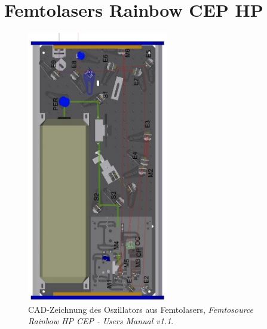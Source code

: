 \documentclass[bachelor,       %
               twoside,        %
               BCOR10mm,       %
               liststotoc,nomtotoc,bibtotoc, %
               english,ngerman, %
               final,          %
               ]{GAUBM}
\begin{document}
\appendix
\chapter{Femtolasers Rainbow CEP HP}
\begin{figure}[!htb]
	\centering
	\includegraphics[width=0.55\textwidth]{figures/RainbowSetupManual.png}
	\caption{CAD-Zeichnung des Oszillators aus Femtolasers, \textit{Femtosource Rainbow HP CEP - Users Manual v1.1}.}
\end{figure}
%
%

\cleardoublepage

\end{document}
